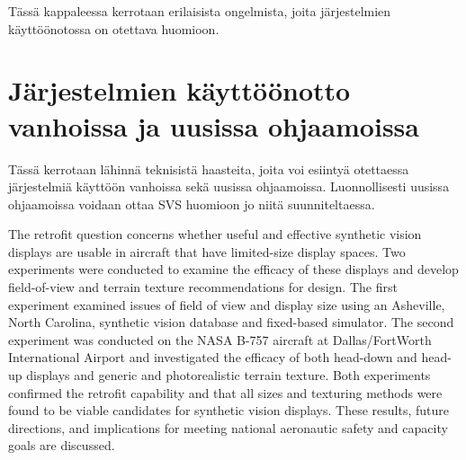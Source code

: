\documentclass[utf8,bachelor,manualbib]{gradu3}
\begin{document}
Tässä kappaleessa kerrotaan erilaisista ongelmista, joita järjestelmien käyttöönotossa on otettava huomioon.

\section{Järjestelmien käyttöönotto vanhoissa ja uusissa ohjaamoissa}

Tässä kerrotaan lähinnä teknisistä haasteita, joita voi esiintyä otettaessa järjestelmiä käyttöön vanhoissa sekä uusissa ohjaamoissa. Luonnollisesti uusissa ohjaamoissa voidaan ottaa SVS huomioon jo niitä suunniteltaessa.

The retrofit question concerns whether useful and effective synthetic vision displays
are usable in aircraft that have limited-size display spaces. Two experiments were
conducted to examine the efficacy of these displays and develop field-of-view and
terrain texture recommendations for design. The first experiment examined issues of
field of view and display size using an Asheville, North Carolina, synthetic vision database
and fixed-based simulator. The second experiment was conducted on the
NASA B-757 aircraft at Dallas/FortWorth International Airport and investigated the
efficacy of both head-down and head-up displays and generic and photorealistic terrain
texture. Both experiments confirmed the retrofit capability and that all sizes and
texturing methods were found to be viable candidates for synthetic vision displays.
These results, future directions, and implications for meeting national aeronautic
safety and capacity goals are discussed. \citep{prinzel2004}
\end{document}
